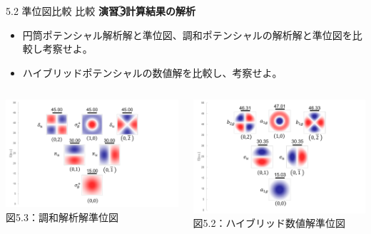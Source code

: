 \documentclass{beamer}
\begin{document}
  \begin{frame}{5.2 準位図比較
    比較}
  \textbf{演習\,\textcircled{3}\quad 計算結果の解析}
        \begin{itemize}
          \item 円筒ポテンシャル解析解と準位図、調和ポテンシャルの解析解と準位図を比較し考察せよ。
          \item ハイブリッドポテンシャルの数値解を比較し、考察せよ。
        \end{itemize}
        

        
        \begin{columns}[t]

          \begin{center}
            \includegraphics[width=1.30\linewidth]{images/調和準位図.png} \\
            \scriptsize 図5.3：調和解析解準位図
          \end{center}


          \begin{center}
            \includegraphics[width=1.30\linewidth]{images/ハイブリッド準位図.png} \\
            \scriptsize 図5.2：ハイブリッド数値解準位図
          \end{center}
          


\end{columns}
\end{frame}
\end{document}
